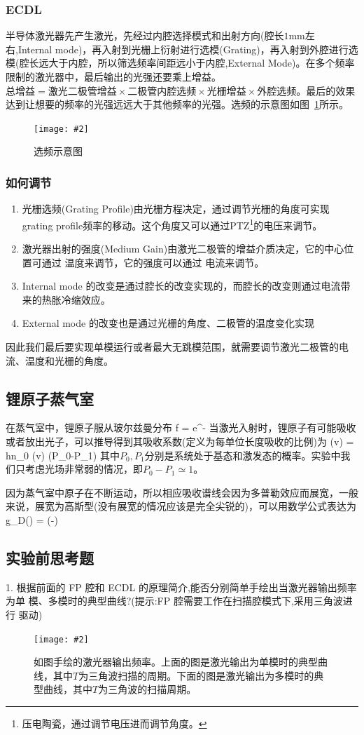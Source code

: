 \documentclass[10pt,a4paper]{ctexart}
\newcommand{\cpic}[2]{
\begin{center}
\texttt{[image: \#2]}
\end{center}
}
\newcommand{\cpicn}[3]
{
\begin{figure}[H]
\cpic{#1}{#2}
\caption{\color{red}#3\label{#2}}
\end{figure}
}
\begin{document}
\subsubsection{ECDL}
半导体激光器先产生激光，先经过内腔选择模式和出射方向(腔长$1$mm左右,Internal mode)，再入射到光栅上衍射进行选模(Grating)，再入射到外腔进行选模(腔长远大于内腔，所以筛选频率间距远小于内腔,External Mode)。在多个频率限制的激光器中，最后输出的光强还要乘上增益。$\text{总增益}=\text{激光二极管增益}\times \text{二极管内腔选频}\times \text{光栅增益}\times\text{外腔选频}$。最后的效果达到让想要的频率的光强远远大于其他频率的光强。选频的示意图如图~\ref{ECDL}所示。
\cpicn{0.3}{ECDL}{选频示意图}
\subsubsection{如何调节}
\begin{enumerate}
	\item 光栅选频(Grating Profile)由光栅方程决定，通过调节光栅的角度可实现grating profile频率的移动。这个角度又可以通过PTZ\footnote{压电陶瓷，通过调节电压进而调节角度。}的电压来调节。
	\item 激光器出射的强度(Medium Gain)由激光二极管的增益介质决定，它的中心位置可通过{\color{red} 温度}来调节，它的强度可以通过{\color{red} 电流}来调节。
	\item Internal mode 的改变是通过腔长的改变实现的，而腔长的改变则通过电流带来的热胀冷缩效应。
	\item External mode 的改变也是通过光栅的角度、二极管的温度变化实现
\end{enumerate}
因此我们最后要实现单模运行或者最大无跳模范围，就需要调节激光二极管的电流、温度和光栅的角度。
\subsection{锂原子蒸气室}
在蒸气室中，锂原子服从玻尔兹曼分布
\beq
f =  e^{-}
\eeq
当激光入射时，锂原子有可能吸收或者放出光子，可以推导得到其吸收系数(定义为每单位长度吸收的比例)为
\beq
\kappa(v) = h\nu n_0 \alpha(v) (P_0-P_1)
\eeq
其中$P_0,P_1$分别是系统处于基态和激发态的概率。实验中我们只考虑光场非常弱的情况，即$P_0-P_1\simeq 1$。

因为蒸气室中原子在不断运动，所以相应吸收谱线会因为多普勒效应而展宽，一般来说，展宽为高斯型(没有展宽的情况应该是完全尖锐的)，可以用数学公式表达为
\beq
g_D(\omega) = \exp\left(-\right)
\eeq

\subsection{实验前思考题}
1. 根据前面的 FP 腔和 ECDL 的原理简介,能否分别简单手绘出当激光器输出频率为单
模、多模时的典型曲线?(提示:FP 腔需要工作在扫描腔模式下,采用三角波进行
驱动)
\cpicn{0.3}{classic}{如图手绘的激光器输出频率。上面的图是激光输出为单模时的典型曲线，其中$T$为三角波扫描的周期。下面的图是激光输出为多模时的典型曲线，其中$T$为三角波的扫描周期。}
\end{document}

